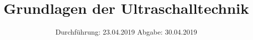 

\subject{US1}
\title{Grundlagen der Ultraschalltechnik}
\date{%
Durchführung: {23.04.2019}
\hspace{3em}
Abgabe: {30.04.2019}
}



\maketitle
\thispagestyle{empty}
\tableofcontents
\newpage





\printbibliography{}

